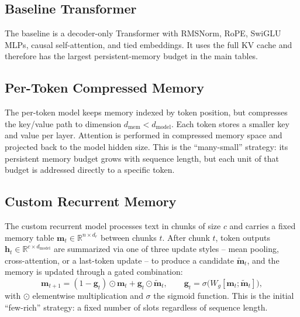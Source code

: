 \documentclass[10pt]{article} %
\begin{document}
\subsection{Baseline Transformer}
The baseline is a decoder-only Transformer with RMSNorm, RoPE, SwiGLU MLPs,
causal self-attention, and tied embeddings. It uses the full KV cache and
therefore has the largest persistent-memory budget in the main tables.

\subsection{Per-Token Compressed Memory}
The per-token model keeps memory indexed by token position, but compresses
the key/value path to dimension $d_{\text{mem}} < d_{\text{model}}$. Each
token stores a smaller key and value per layer. Attention is performed in
compressed memory space and projected back to the model hidden size. This
is the ``many-small'' strategy: its persistent memory budget grows with
sequence length, but each unit of that budget is addressed directly to a
specific token.

\subsection{Custom Recurrent Memory}
\label{sec:custom-recurrent}
The custom recurrent model processes text in chunks of size $c$ and carries
a fixed memory table $\mathbf{m}_t \in \mathbb{R}^{n \times d_r}$ between
chunks $t$. After chunk $t$, token outputs $\mathbf{h}_t \in
\mathbb{R}^{c \times d_{\text{model}}}$ are summarized via one of three
update styles -- mean pooling, cross-attention, or a last-token update -- to
produce a candidate $\mathbf{\tilde m}_t$, and the memory is updated through
a gated combination:
\begin{equation}
  \mathbf{m}_{t+1} = (1 - \mathbf{g}_t) \odot \mathbf{m}_t + \mathbf{g}_t \odot \mathbf{\tilde m}_t,
  \qquad \mathbf{g}_t = \sigma\!\big(W_g [\mathbf{m}_t ; \mathbf{\tilde m}_t]\big),
  \label{eq:gate}
\end{equation}
with $\odot$ elementwise multiplication and $\sigma$ the sigmoid function.
This is the initial ``few-rich'' strategy: a fixed number of slots
regardless of sequence length.
\end{document}
